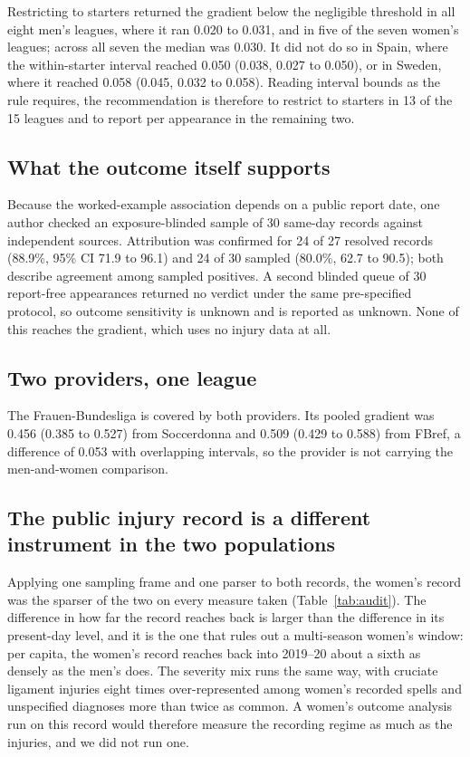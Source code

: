 \documentclass[11pt]{article}
\begin{document}
Restricting to starters returned the gradient below the negligible threshold in all eight men's leagues, where it ran 0.020 to 0.031, and in five of the seven women's leagues; across all seven the median was 0.030. It did not do so in Spain, where the within-starter interval reached 0.050 (0.038, 0.027 to 0.050), or in Sweden, where it reached 0.058 (0.045, 0.032 to 0.058). Reading interval bounds as the rule requires, the recommendation is therefore to restrict to starters in 13 of the 15 leagues and to report per appearance in the remaining two.

\subsection{What the outcome itself supports}

Because the worked-example association depends on a public report date, one author checked an exposure-blinded sample of 30 same-day records against independent sources. Attribution was confirmed for 24 of 27 resolved records (88.9\%, 95\% CI 71.9 to 96.1) and 24 of 30 sampled (80.0\%, 62.7 to 90.5); both describe agreement among sampled positives. A second blinded queue of 30 report-free appearances returned no verdict under the same pre-specified protocol, so outcome sensitivity is unknown and is reported as unknown. None of this reaches the gradient, which uses no injury data at all.

\subsection{Two providers, one league}

The Frauen-Bundesliga is covered by both providers. Its pooled gradient was 0.456 (0.385 to 0.527) from Soccerdonna and 0.509 (0.429 to 0.588) from FBref, a difference of 0.053 with overlapping intervals, so the provider is not carrying the men-and-women comparison.

\subsection{The public injury record is a different instrument in the two populations}

Applying one sampling frame and one parser to both records, the women's record was the sparser of the two on every measure taken (Table~\ref{tab:audit}). The difference in how far the record reaches back is larger than the difference in its present-day level, and it is the one that rules out a multi-season women's window: per capita, the women's record reaches back into 2019--20 about a sixth as densely as the men's does. The severity mix runs the same way, with cruciate ligament injuries eight times over-represented among women's recorded spells and unspecified diagnoses more than twice as common. A women's outcome analysis run on this record would therefore measure the recording regime as much as the injuries, and we did not run one.
\end{document}
